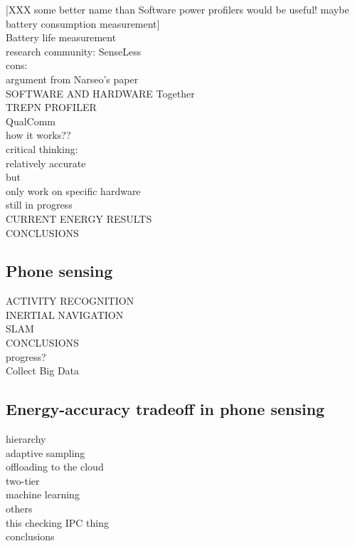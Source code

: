 [XXX some better name than Software power profilers would be useful!
 maybe battery consumption measurement]\\

Battery life measurement\\
	
	research community: SenseLess\\
	cons:\\
		argument from Narseo's paper\\
	
	
	
SOFTWARE AND HARDWARE Together\\
	TREPN PROFILER\\
		QualComm\\
		how it works??\\
		critical thinking:\\
			relatively accurate\\
			but\\
				only work on specific hardware \\
				still in progress\\
		

CURRENT ENERGY RESULTS\\

CONCLUSIONS\\


\subsection{Phone sensing}
ACTIVITY RECOGNITION\\

INERTIAL NAVIGATION\\

SLAM\\

CONCLUSIONS\\
	progress?\\
	Collect Big Data\\
	
\subsection{Energy-accuracy tradeoff in phone sensing}
hierarchy\\

adaptive sampling\\

offloading to the cloud\\

two-tier\\

machine learning\\

others\\
	this checking IPC thing\\

conclusions
